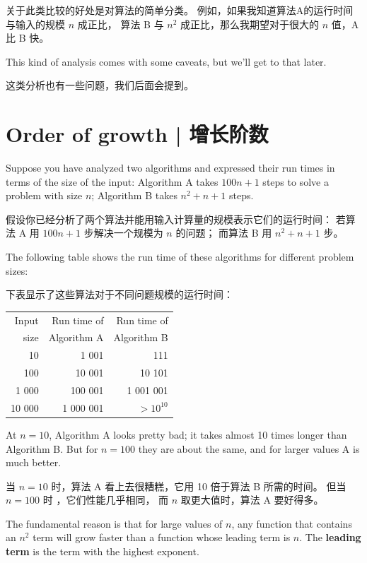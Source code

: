 关于此类比较的好处是对算法的简单分类。
例如，如果我知道算法A的运行时间与输入的规模 $n$ 成正比，
算法 B 与 $n^2$ 成正比，那么我期望对于很大的 $n$ 值，A 比 B 快。

This kind of analysis comes with some caveats, but we'll get
to that later.

这类分析也有一些问题，我们后面会提到。


\section{Order of growth  |  增长阶数}

Suppose you have analyzed two algorithms and expressed
their run times in terms of the size of the input:
Algorithm A takes $100n+1$ steps to solve a problem with
size $n$; Algorithm B takes $n^2 + n + 1$ steps.

假设你已经分析了两个算法并能用输入计算量的规模表示它们的运行时间：
若算法 A 用 $100n+1$ 步解决一个规模为 $n$ 的问题；
而算法 B 用 $n^2 + n + 1$ 步。
  

The following table shows the run time of these algorithms
for different problem sizes:

下表显示了这些算法对于不同问题规模的运行时间：

\begin{tabular}{|r|r|r|}
\hline
Input     &   Run time of     & Run time of \\
size      &   Algorithm A     & Algorithm B \\
\hline
10        &   1 001           & 111         \\
100       &   10 001          & 10 101         \\
1 000     &   100 001         & 1 001 001         \\
10 000    &   1 000 001       & $> 10^{10}$         \\
\hline
\end{tabular}

At $n=10$, Algorithm A looks pretty bad; it takes almost 10 times
longer than Algorithm B.  But for $n=100$ they are about the same, and
for larger values A is much better.

当 $n=10$ 时，算法 A 看上去很糟糕，它用 10 倍于算法 B 所需的时间。
但当 $n=100$ 时 ，它们性能几乎相同， 而 $n$ 取更大值时，算法 A 要好得多。

The fundamental reason is that for large values of $n$, any function
that contains an $n^2$ term will grow faster than a function whose
leading term is $n$.  The {\bf leading term} is the term with the
highest exponent.

